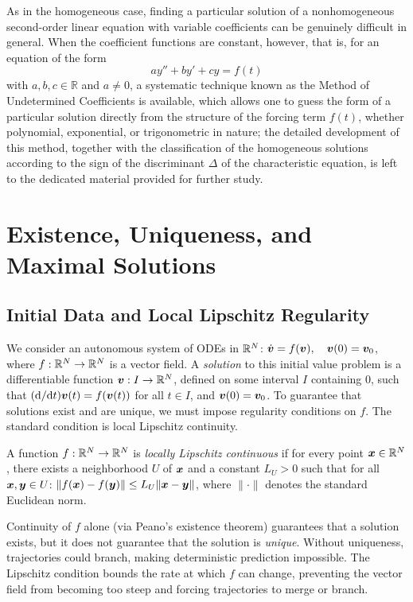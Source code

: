 As in the homogeneous case, finding a particular solution of a nonhomogeneous second-order linear equation with variable coefficients can be genuinely difficult in general. When the coefficient functions are constant, however, that is, for an equation of the form
\[
a y'' + b y' + c y = f(t)
\]
 with $a, b, c \in \mathbb{R}$ and $a \neq 0$, a systematic technique known as the Method of Undetermined Coefficients is available, which allows one to guess the form of a particular solution directly from the structure of the forcing term $f(t)$, whether polynomial, exponential, or trigonometric in nature; the detailed development of this method, together with the classification of the homogeneous solutions according to the sign of the discriminant $\Delta$ of the characteristic equation, is left to the dedicated material provided for further study.

\section{Existence, Uniqueness, and Maximal Solutions}

\subsection{Initial Data and Local Lipschitz Regularity}

We consider an autonomous system of ODEs in $\mathbb{R}^N$: $\dot{\bm{v}} = f(\bm{v}), \quad \bm{v}(0) = \bm{v}_0$, where $f: \mathbb{R}^N \to \mathbb{R}^N$ is a vector field. A \textit{solution} to this initial value problem is a differentiable function $\bm{v}: I \to \mathbb{R}^N$, defined on some interval $I$ containing $0$, such that $(\mathrm{d}/\mathrm{d} t)\bm{v}(t) = f(\bm{v}(t))$ for all $t \in I$, and $\bm{v}(0) = \bm{v}_0$. To guarantee that solutions exist and are unique, we must impose regularity conditions on $f$. The standard condition is local Lipschitz continuity.

\begin{definition}
A function $f: \mathbb{R}^N \to \mathbb{R}^N$ is \textit{locally Lipschitz continuous} if for every point $\bm{x} \in \mathbb{R}^N$, there exists a neighborhood $U$ of $\bm{x}$ and a constant $L_U > 0$ such that for all $\bm{x}, \bm{y} \in U$: $\|f(\bm{x}) - f(\bm{y})\| \leq L_U \|\bm{x} - \bm{y}\|$, where $\|\cdot\|$ denotes the standard Euclidean norm.
\end{definition}

\begin{remark}
Continuity of $f$ alone (via Peano's existence theorem) guarantees that a solution exists, but it does not guarantee that the solution is \textit{unique}. Without uniqueness, trajectories could branch, making deterministic prediction impossible. The Lipschitz condition bounds the rate at which $f$ can change, preventing the vector field from becoming too steep and forcing trajectories to merge or branch.
\end{remark}


